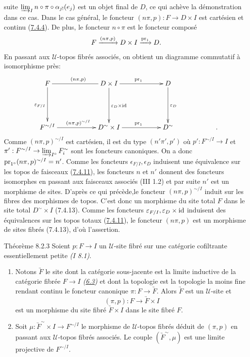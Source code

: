 \documentclass[10pt]{../fichiers-configuration-latex/smfart}
\begin{document}
suite $\varinjlim_I n \circ \pi \circ
\alpha_{j!}(e_j)$ est un objet final de $D$, ce qui achève la
démonstration dans ce cas. Dans le cas général, le foncteur $(n \pi,
p) : F \to D \times I$ est cartésien et continu (\hyperref[VI.prop7.4.4]{7.4.4}). De plus, le
foncteur $n \circ \pi$ est le foncteur composé
$$
F \xrightarrow{(n \pi, p)} D \times I \xrightarrow{\operatorname{pr}_1} D{}.
$$
En passant aux $𝒰$-topos fibrés associés, on obtient un diagramme
commutatif à isomorphisme près:
\[
\xymatrix@C=2cm@R=1.75cm{
F       \ar@{-}[r]^{(n\pi,p)} \ar[d]_{\varepsilon_{F/I}}& D\times I
\ar[r]^{\pr_1}\ar[d]^{\varepsilon_D\times \id} & D \ar[d]^{\varepsilon_D}\\
F^{\sim/I}  \ar[r]^{(n\pi,p)^{\sim/I}} & D^{\sim}\times I \ar[r]^{\pr_1} & D^{\sim}&.
}
\]
Comme $(n\pi, p)^{\sim/I}$ est cartésien, il est du type $(n'\pi',
p')$ où $p': F^{\sim/I} \to I$ et $\pi': F^{\sim/I} \to
\varinjlim_{I^{\circ}} F^{\sim}_i$ sont les foncteurs canoniques. On
a donc $\operatorname{pr}_{1^{\circ}}(n\pi, p)^{\sim/I} = n'$. Comme les foncteurs
$\epsilon_{F/I}, \epsilon_D$ induisent une équivalence sur les topos
de faisceaux (\hyperref[VI.cor7.4.11]{7.4.11}), les foncteurs $n$ et $n'$ donnent
des foncteurs isomorphes en passant aux faisceaux associés (III 1.2)
et par suite $n'$ est un morphisme de sites. D'après ce qui
précède,\pageoriginale le foncteur $(n\pi, p)^{\sim/I}$ induit sur
les fibres des morphismes de topos. C'est donc un morphisme du site
total $F$ dans le site total $D^{\sim} \times I$ (7.4.13). Comme les
foncteurs $\varepsilon_{F /I}, \varepsilon_{D} \times \operatorname{id}$ induisent des
équivalences sur les topos totaux (\hyperref[VI.cor7.4.11]{7.4.11}), le foncteur
$(n \pi, p)$ est un morphisme de sites fibrés (7.4.13), d'où
l'assertion.

\begin{enonce*}{Théorème 8.2.3}
Soient $p : F \to I$ un $𝒰$-site fibré sur une catégorie cofiltrante
essentiellement petite \emph{(I 8.1)}.
\begin{enumerate}
\renewcommand{\labelenumi}{\theenumi)}
\item Notons $\underrightarrow{F}$ le site dont la catégorie sous-jacente est
  la limite inductive de la catégorie fibrée $F \to I$ \emph{(\hyperref[VI.def6.3]{6.3})} et dont
  la topologie est la topologie la moins fine rendant continu le
  foncteur canonique $\pi : F \to \underrightarrow{F}$. Alors
  $\underrightarrow{F}$ est un $𝒰$-site et
$$
(\pi, p) : F \to \underrightarrow{F} \times I
$$
est un morphisme du site fibré $\underrightarrow{F} \times I$ dans le site
fibré $F$.

\item Soit $\mu : \underrightarrow{F}^{\sim} \times I \to F^{\sim/I}$ le
  morphisme de $𝒰$-topos fibrés déduit de $(\pi, p)$ en passant aux
  $𝒰$-topos fibrés associés. Le couple $(\underrightarrow{F}^{\sim}, \mu)$
  est une limite projective de $F^{\sim/I}$.
\end{enumerate}
\end{enonce*}
\end{document}

